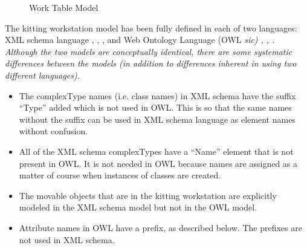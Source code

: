 \begin{flushleft}
\end{flushleft}
\begin{figure}[h]
\caption{Work Table Model}
\label{fig:WorkTable}
\end{figure}

The kitting workstation model has been fully defined in each of two
languages: XML schema language \cite{Walmsley.2002},
\cite{XMLschemaPrimer}, \cite{XMLschemaStructures}, and Web Ontology
Language (OWL \it sic\rm) \cite{OWLoverview}, \cite{OWLprimer},
\cite{OWLspec}. Although the two models are conceptually identical, there
are some systematic differences between the models (in addition to
differences inherent in using two different languages).

\begin{itemize}

\item The complexType names (i.e. class names) in XML schema have the
  suffix ``Type'' added which is not used in OWL. This is so that the same
  names without the suffix can be used in XML schema language as element
  names without confusion.

\item All of the XML schema complexTypes have a ``Name'' element that is
  not present in OWL. It is not needed in OWL because names are assigned as
  a matter of course when instances of classes are created.

\item The movable objects that are in the kitting workstation are
  explicitly modeled in the XML schema model but not in the OWL model.

\item Attribute names in OWL have a prefix, as described below. The
  prefixes are not used in XML schema.

\end{itemize}

